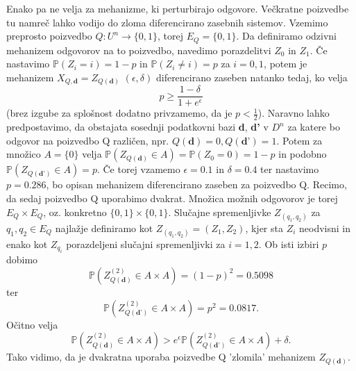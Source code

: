 \documentclass[mat1]{article}
\theoremstyle{definition}
\begin{document}
\newline
\newline
Enako pa ne velja za mehanizme, ki perturbirajo odgovore. Večkratne poizvedbe tu namreč lahko vodijo do zloma diferencirano zasebnih sistemov. Vzemimo preprosto poizvedbo $Q: U^n \rightarrow \{0,1\}$, torej $E_Q = \{0,1\}$. Da definiramo odzivni mehanizem odgovorov na to poizvedbo, navedimo porazdelitvi $Z_0$ in $Z_1$. Če nastavimo $\mathbb{P}(Z_i=i)=1-p$ in $\mathbb{P}(Z_i\neq i)=p$ za $i = 0,1$, potem je mehanizem $X_{Q,\textbf{d}} = Z_{Q(\textbf{d})}$ $(\epsilon, \delta)$ diferencirano zaseben natanko tedaj, ko velja $$p \geq \frac{1-\delta}{1+e^{\epsilon}}$$ (brez izgube za splošnost dodatno privzamemo, da je $p < \frac{1}{2}$).  Naravno lahko predpostavimo, da obstajata sosednji podatkovni bazi \textbf{d}, \textbf{d'} v $D^n$ za katere bo odgovor na poizvedbo Q različen, npr. $Q(\textbf{d})=0, Q(\textbf{d'})=1$. Potem za množico $A = \{0\}$ velja  $\mathbb{P}(Z_{Q(\textbf{d})} \in A) = \mathbb{P}(Z_0 = 0) = 1 - p$ in podobno $\mathbb{P}(Z_{Q(\textbf{d'})} \in A) =  p$. Če torej vzamemo $\epsilon = 0.1$ in $\delta = 0.4$ ter nastavimo $p = 0.286$, bo opisan mehanizem diferencirano zaseben za poizvedbo Q.
 \newline
\newline
Recimo, da sedaj poizvedbo Q uporabimo dvakrat. Množica možnih odgovorov je torej $E_Q \times E_Q$, oz. konkretno $\{0,1\} \times \{0,1\}$. Slučajne spremenljivke $Z_{(q_1, q_2)}$ za $q_1,q_2 \in E_Q$ najlažje definiramo kot $Z_{(q_1, q_2)} = (Z_1, Z_2)$, kjer sta $Z_i$ neodvisni in enako kot $Z_{q_i}$ porazdeljeni slučajni spremenljivki za $i = 1,2$. Ob isti izbiri $p$ dobimo $$\mathbb{P}(Z_{Q(\textbf{d})}^{(2)} \in A \times A) = (1-p)^2 = 0.5098$$ ter $$\mathbb{P}(Z_{Q(\textbf{d'})}^{(2)} \in A \times A) = p^2 = 0.0817.$$ Očitno velja $$\mathbb{P}(Z_{Q(\textbf{d})}^{(2)} \in A \times A) > e^{\epsilon}\mathbb{P}(Z_{Q(\textbf{d'})}^{(2)} \in A \times A) + \delta.$$ Tako vidimo, da je dvakratna uporaba poizvedbe Q 'zlomila' mehanizem $Z_{Q(\textbf{d})}$.
\end{document}
